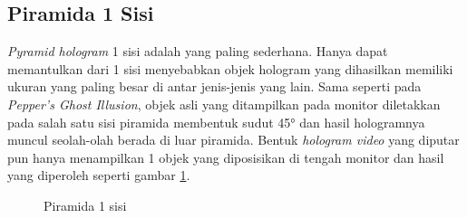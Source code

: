 	\subsection{Piramida 1 Sisi}
	\vspace{1ex}
	\textit{Pyramid hologram} 1 sisi adalah yang paling sederhana. Hanya dapat memantulkan dari 1 sisi menyebabkan objek hologram yang dihasilkan memiliki ukuran yang paling besar di antar jenis-jenis yang lain. Sama seperti pada \textit{Pepper’s Ghost Illusion}, objek asli yang ditampilkan pada monitor diletakkan pada salah satu sisi piramida membentuk sudut 45° dan hasil hologramnya muncul seolah-olah berada di luar piramida. Bentuk \textit{hologram video} yang diputar pun hanya menampilkan 1 objek yang diposisikan di tengah monitor dan hasil yang diperoleh seperti gambar \ref{fig:piramid1}.
	\begin{figure} [H]
		\hspace{0.1em}
		\caption{Piramida 1 sisi}
		\label{fig:piramid1}
	\end{figure}
	\vspace{1.5ex}
	
